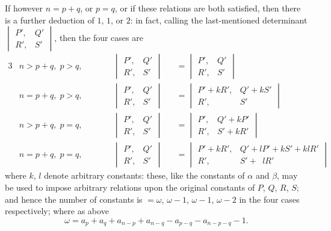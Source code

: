 \documentclass[12pt,a4paper,oneside]{book}
\theoremstyle{plain}
\theoremstyle{definition}
\theoremstyle{remark}
\begin{document}
If however $n=p+q$, or $p=q$, or if these relations are both satisfied, then there is a further deduction of $1$, $1$, or $2$: in fact, calling the last-mentioned determinant $\begin{vmatrix} P', & Q' \\ R', & S' \end{vmatrix}$, then the four cases are
\begin{alignat*}{3}
&n > p+q,\; p > q,\qquad
&&\begin{vmatrix} P', & Q' \\ R', & S' \end{vmatrix}
&&=\begin{vmatrix} P', & Q' \\ R', & S' \end{vmatrix}\\[0.5em]
&n = p+q,\; p > q,\qquad
&&\begin{vmatrix} P', & Q' \\ R', & S' \end{vmatrix}
&&=\begin{vmatrix} P'+kR', & Q'+kS' \\ R', & S' \end{vmatrix}\\[0.5em]
&n > p+q,\; p = q,\qquad
&&\begin{vmatrix} P', & Q' \\ R', & S' \end{vmatrix}
&&=\begin{vmatrix} P', & Q'+kP' \\ R', & S'+kR' \end{vmatrix}\\[0.5em]
&n = p+q,\; p = q,\qquad
&&\begin{vmatrix} P', & Q' \\ R', & S' \end{vmatrix}
&&=\begin{vmatrix} P'+kR', & Q'+lP'+kS'+klR' \\ R', & S'+\phantom{k}lR' \end{vmatrix}
\end{alignat*}
where $k$, $l$ denote arbitrary constants: these, like the constants of $\alpha$ and $\beta$, may be used to impose arbitrary relations upon the original constants of $P$, $Q$, $R$, $S$; and hence the number of constants is $=\omega$, $\omega-1$, $\omega-1$, $\omega-2$ in the four cases respectively; where as above
\[
\omega = a_p+a_q+a_{n-p}+a_{n-q}-a_{p-q}-a_{n-p-q}-1.
\]
\end{document}
